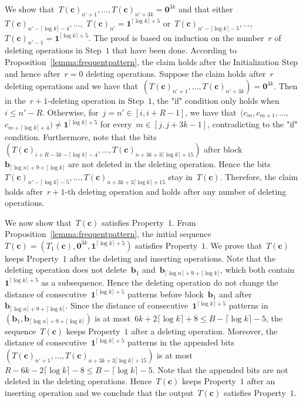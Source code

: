 \documentclass[10pt,a4paper,onecolumn]{IEEEtran}
\newcommand{\1}{\mathbbold{1}}
\newcommand{\boldb}{\mathbf{b}}
\newcommand{\boldc}{\mathbf{c}}
\begin{document}
We show that~$T(\boldc)_{n'+1},\ldots,T(\boldc)_{n'+3k}=\boldsymbol{0}^{3k}$ and that either~$T(\boldc)_{n'-\lceil\log k\rceil-4},\ldots,$ $T(\boldc)_{n'}=\boldsymbol{1}^{\lceil\log k\rceil+5}$ or~$T(\boldc)_{n'-\lceil\log k\rceil-5},\ldots,$ $T(\boldc)_{n'-1}=\boldsymbol{1}^{\lceil\log k\rceil+5}$. 
The proof is based on induction on the number~$r$ of deleting operations in Step~$1$ that have been done.
According to Proposition~\ref{lemma:frequentpattern}, the claim holds after the Initialization Step and hence after~$r=0$ deleting operations. Suppose the claim holds after~$r$ deleting operations and we have that~$(T(\boldc)_{n'+1},\ldots,T(\boldc)_{n'+3k})=\boldsymbol{0}^{3k}$. Then in the~$r+1$-deleting operation in Step~$1$, the "if" condition only holds when~$i\le n'-R$. Otherwise, for~$j=n'\in [i,i+R-1]$, we have that~$(c_m,c_{m+1},\ldots,$ $c_{m+\lceil \log k \rceil +4})\ne\boldsymbol{1}^{\lceil \log k \rceil +5}$ for every~$m\in [j,j+3k-1]$, contradicting to the "if" condition. Furthermore, note that the bits~$(T(\boldc)_{i+R-3k-\lceil\log k\rceil-4},\ldots,T(\boldc)_{n+3k+3\lceil\log k\rceil+15})$ after block~$\boldb_{\lceil \log n\rceil+9+\lceil\log k\rceil}$ are not deleted in the deleting operation.
Hence the bits~$T(\boldc)_{n'-\lceil\log k\rceil-5},\ldots,T(\boldc)_{n+3k+3\lceil\log k\rceil+15}$ stay in~$T(\boldc)$. Therefore, the claim holds after~$r+1$-th deleting operation and holds after any number of deleting operations. 

We now show that~$T(\boldc)$ satisfies Property~$1$.
From Proposition~\ref{lemma:frequentpattern}, the initial sequence~$T(\boldc)=(T_1(\boldc),\boldsymbol{0}^{3k},\boldsymbol{1}^{\lceil\log k\rceil+5})$ satisfies Property~$1$. 
We prove that~$T(\boldc)$ keeps Property~$1$ after the deleting and inserting operations. 
Note that the deleting operation does not delete~$\boldb_1$ and~$\boldb_{\lceil \log n\rceil +9+\lceil\log k\rceil}$, which both contain~$\boldsymbol{1}^{\lceil\log k\rceil+5}$ as a subsequence. Hence the deleting operation do not change the distance of consecutive~$\boldsymbol{1}^{\lceil\log k\rceil+5}$ patterns before block~$\boldb_1$ and after~$\boldb_{\lceil \log n\rceil +9+\lceil\log k\rceil}$. Since the distance of consecutive~$\boldsymbol{1}^{\lceil\log k\rceil+5}$ patterns in~$(\boldb_1,\boldb_{\lceil \log n\rceil +9+\lceil\log k\rceil})$ is at most~$6k+2\lceil\log k\rceil+8\le B-\lceil\log k\rceil-5$, the sequence~$T(\boldc)$ keeps Property~$1$ after a deleting operation. Moreover, the distance of consecutive~$\boldsymbol{1}^{\lceil\log k\rceil+5}$ patterns in the
appended bits~$(T(\boldc)_{n'+1},\ldots,T(\boldc)_{n+3k+3\lceil\log k\rceil+15})$ is at most~$R-6k-2\lceil\log k\rceil-8\le B-\lceil\log k\rceil-5$. Note that the appended bits are not deleted in the deleting operations. Hence~$T(\boldc)$ keeps Property~$1$ after an inserting operation and we conclude that the output~$T(\boldc)$ satisfies Property~$1$. 
\end{document}
